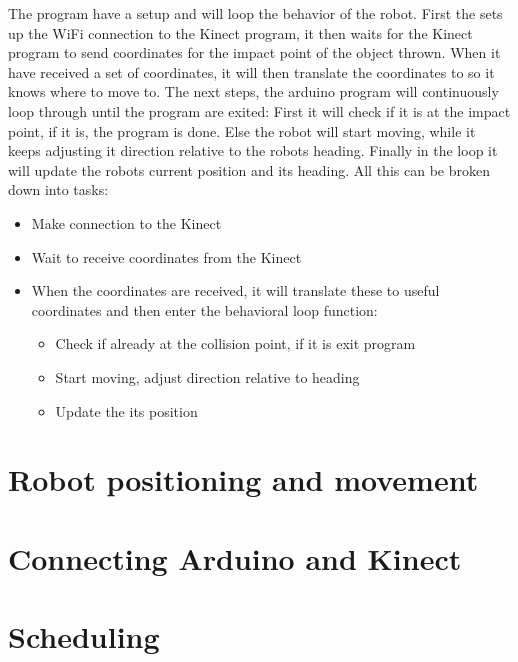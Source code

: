 The program have a setup and will loop the behavior of the robot. First the sets up the WiFi connection to the Kinect program, it then waits for the Kinect program to send coordinates for the impact point of the object thrown. When it have received a set of coordinates, it will then translate the coordinates to so it knows where to move to. The next steps, the arduino program will continuously loop through until the program are exited: First it will check if it is at the impact point, if it is, the program is done. Else the robot will start moving, while it keeps adjusting it direction relative to the robots heading. Finally in the loop it will update the robots current position and its heading. All this can be broken down into tasks:

\begin{itemize}
	\item Make connection to the Kinect
	\item Wait to receive coordinates from the Kinect
	\item When the coordinates are received, it will translate these to useful coordinates and then enter the behavioral loop function:
	\begin{itemize}
		\item Check if already at the collision point, if it is exit program
		\item Start moving, adjust direction relative to heading
		\item Update the its position
	\end{itemize}
\end{itemize}
 

\section{Robot positioning and movement}
\label{sec:Robot positioning and movement}

\section{Connecting Arduino and Kinect}
\label{sec:Connecting Arduino and Kinect}

\section{Scheduling}
\label{sec:Scheduling}
